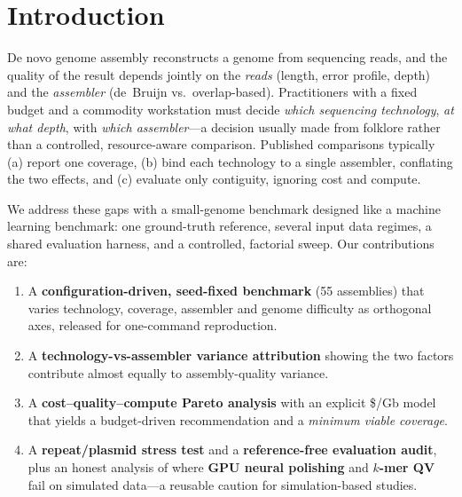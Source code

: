 \documentclass[runningheads]{llncs}
\begin{document}
\section{Introduction}
De novo genome assembly reconstructs a genome from sequencing reads, and the
quality of the result depends jointly on the \emph{reads} (length, error
profile, depth) and the \emph{assembler} (de~Bruijn vs.\ overlap-based).
Practitioners with a fixed budget and a commodity workstation must decide
\emph{which sequencing technology}, \emph{at what depth}, with \emph{which
assembler}---a decision usually made from folklore rather than a controlled,
resource-aware comparison. Published comparisons typically (a) report one
coverage, (b) bind each technology to a single assembler, conflating the two
effects, and (c) evaluate only contiguity, ignoring cost and compute.

We address these gaps with a small-genome benchmark designed like a machine
learning benchmark: one ground-truth reference, several input data regimes,
a shared evaluation harness, and a controlled, factorial sweep. Our
contributions are:
\begin{enumerate}
\item A \textbf{configuration-driven, seed-fixed benchmark} (55 assemblies)
that varies technology, coverage, assembler and genome difficulty as
orthogonal axes, released for one-command reproduction.
\item A \textbf{technology-vs-assembler variance attribution} showing the two
factors contribute almost equally to assembly-quality variance.
\item A \textbf{cost--quality--compute Pareto analysis} with an explicit
\$/Gb model that yields a budget-driven recommendation and a
\emph{minimum viable coverage}.
\item A \textbf{repeat/plasmid stress test} and a \textbf{reference-free
evaluation audit}, plus an honest analysis of where \textbf{GPU neural
polishing} and \textbf{$k$-mer QV} fail on simulated data---a reusable
caution for simulation-based studies.
\end{enumerate}
\end{document}

